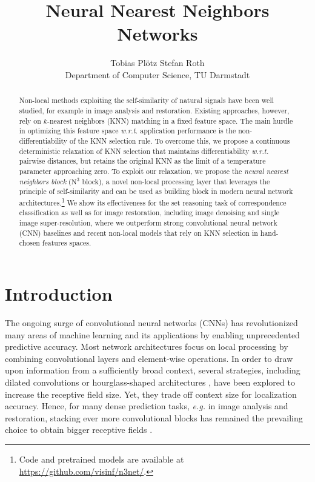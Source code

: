 \documentclass{article}
\title{Neural Nearest Neighbors Networks}
\author{Tobias Pl\"otz \qquad Stefan Roth \\ Department of Computer Science, TU Darmstadt}
\makeatletter
\newcommand{\eg}{\emph{e.\thinspace{}g.}\@\xspace}
\newcommand{\wrt}{\emph{w.\thinspace{}r.\thinspace{}t.}\@\xspace}
\newcommand\kk{k}
\newcommand\nnn{\text{N}^3}
\makeatother
\begin{document}
\maketitle



\begin{abstract}
  Non-local methods exploiting the self-similarity of natural signals have been well studied, for example in image analysis and restoration.
Existing approaches, however, rely on $\kk$-nearest neighbors (KNN) matching in a fixed feature space. 
The main hurdle in optimizing this feature space \wrt application performance is the non-differentiability of the KNN selection rule. 
To overcome this, we propose a continuous deterministic relaxation of KNN selection
that maintains differentiability \wrt pairwise distances, but retains the original KNN as the limit of a temperature parameter approaching zero. 
To exploit our relaxation, we propose the \emph{neural nearest neighbors block} ($\nnn$ block), a novel non-local processing layer that leverages the principle of self-similarity and can be used as building block in modern neural network architectures.\footnote{Code and pretrained models are available at \url{https://github.com/visinf/n3net/}.} 
We show its effectiveness for the set reasoning task of correspondence classification as well as for image restoration, including image denoising and single image super-resolution, where we outperform strong convolutional neural network (CNN) baselines and recent non-local models that rely on KNN selection in hand-chosen features spaces.
 \end{abstract}
\section{Introduction}
The ongoing surge of convolutional neural networks (CNNs) has revolutionized many
areas of machine learning and its applications by enabling unprecedented predictive accuracy. 
Most network architectures focus on local processing by combining convolutional layers and element-wise operations. 
In order to draw upon information from a sufficiently broad context, several strategies, including dilated convolutions \cite{Yu:2015:MSC} or hourglass-shaped architectures \cite{Long:2015:FCN}, have been explored to increase the receptive field size. 
Yet, they trade off context size for localization accuracy.
Hence, for many dense prediction tasks, \eg in image analysis and restoration, stacking ever more convolutional blocks has remained the prevailing choice to obtain bigger receptive fields \cite{Kim:2016:VDSR,Ledig:2017:PRS,Mao:2016:IRU,Timofte:2017:NTI,Zhang:2017:BGD}.
\end{document}
